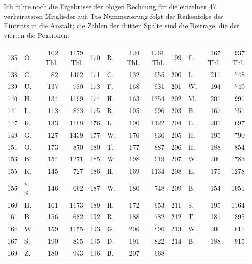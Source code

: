Ich führe noch die Ergebnisse der obigen Rechnung für die einzelnen 47 verheirateten Mitglieder auf. Die Nummerierung folgt der Reihenfolge des Eintritts in die Anstalt; die Zahlen der dritten Spalte sind die Beiträge, die der vierten die Pensionen.

\begin{center}
\footnotesize\setlength{\tabcolsep}{2pt}
\begin{tabular}{r|l|r|r||r|l|r|r||r|l|r|r}
135&O.&102 Thl.&1179 Thl.&170&R.&124 Thl.&1261 Thl.&199&F.&167 Thl.&937 Thl.\\
138&C.&82&1402&171&C.&132&955&200&L.&211&748\\
139&U.&137&730&173&F.&168&931&201&W.&194&749\\
140&H.&134&1199&174&H.&163&1354&202&M.&201&991\\
141&L.&113&833&175&R.&195&996&203&B.&167&751\\
147&R.&133&1188&176&L.&190&1122&204&E.&201&697\\
149&G.&127&1439&177&W.&176&936&205&H.&195&790\\
151&O.&173&870&180&T.&177&887&206&H.&188&854\\
153&B.&154&1271&185&W.&198&919&207&W.&200&783\\
155&K.&145&727&186&H.&169&1134&208&E.&175&1278\\
156&v. S.&146&662&187&W.&180&748&209&B.&154&1051\\
160&H.&161&1173&189&H.&172&953&211&S.&195&1164\\
161&B.&156&682&192&R.&188&782&212&T.&181&895\\
164&W.&159&1155&193&G.&206&896&213&W.&200&811\\
167&S.&190&835&195&D.&191&822&214&B.&188&915\\
169&Z.&180&943&196&B.&207&968&&&&
\end{tabular}
\end{center}
